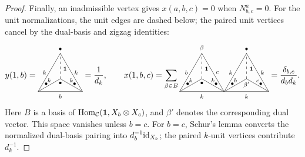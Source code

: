 \documentclass{amsart}
\begin{document}
\begin{proof}
Finally, an inadmissible vertex gives $x(a,b,c)=0$ when $N_{b,c}^a=0$.
For the unit normalizations, the unit edges are dashed below; the paired
unit vertices cancel by the dual-basis and zigzag identities:
\[
y(1,b)=
\begin{tikzpicture}[baseline=.6cm,font=\scriptsize,scale=.95]
\draw (0,0)--(1,0) node[below] {$b$} --(2,0);
\draw (0,0)--(.5,.866) node[left] {$k$} --(1,1.732);
\draw (2,0)--(1.5,.866) node[right] {$k$} --(1,1.732);
\draw (0,0)--(.5,.2885) node[above] {$k$} --(1,.577);
\draw (2,0)--(1.5,.2885) node[above] {$k$} --(1,.577);
\draw[dashed] (1,.577)--(1,1.035) node[right] {$\one$} --(1,1.732);
\node[above] at (1,1.732) {$\bullet$};
\node[below] at (1,.577) {$\bullet$};
\node at (.36,.35) {$\bullet$};\node at (1.64,.35) {$\bullet$};
\end{tikzpicture}
=\frac1{d_k},
\qquad
x(1,b,c)=\sum_{\beta\in B}
\begin{tikzpicture}[baseline=.6cm,font=\scriptsize,scale=.95]
\draw (0,0)--(1,0) node[below] {$k$} --(2,0);
\draw (0,0)--(.5,.866) node[left] {$b$} --(1,1.732);
\draw (2,0)--(1.5,.866) node[right] {$c$} --(1,1.732);
\draw (0,0)--(.5,.2885) node[above] {$k$} --(1,.577);
\draw (2,0)--(1.5,.2885) node[above] {$k$} --(1,.577);
\draw[dashed] (1,.577)--(1,1.035) node[right] {$\one$} --(1,1.732);
\node[above] at (1,1.732) {$\beta$};
\node[below] at (1,.577) {$\bullet$};
\node at (.36,.35) {$\bullet$};\node at (1.64,.35) {$\bullet$};
\end{tikzpicture}
\begin{tikzpicture}[baseline=.6cm,font=\scriptsize,scale=.95]
\draw (0,0)--(1,0) node[below] {$k$} --(2,0);
\draw (0,0)--(.5,.866) node[left] {$k$} --(1,1.732);
\draw (2,0)--(1.5,.866) node[right] {$k$} --(1,1.732);
\draw (0,0)--(.5,.2885) node[above] {$b$} --(1,.577);
\draw (2,0)--(1.5,.2885) node[above] {$c$} --(1,.577);
\draw[dashed] (1,.577)--(1,1.035) node[right] {$\one$} --(1,1.732);
\node[above] at (1,1.732) {$\bullet$};
\node[below] at (1,.577) {$\beta'$};
\node at (.36,.35) {$\bullet$};\node at (1.64,.35) {$\bullet$};
\end{tikzpicture}
=\frac{\delta_{b,c}}{d_bd_k}.
\]
Here $B$ is a basis of $\mathrm{Hom}_{\mathcal{C}}({\bf 1},X_b\otimes X_c)$, and $\beta'$ denotes
the corresponding dual vector. This space vanishes unless $b=c$. For $b=c$, Schur's lemma converts
the normalized dual-basis pairing into $d_b^{-1}\mathrm{id}_{X_b}$;
the paired $k$-unit vertices contribute $d_k^{-1}$.
\end{proof}
\end{document}
